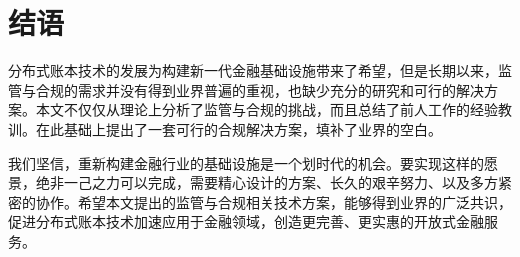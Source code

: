 \section{结语}

分布式账本技术的发展为构建新一代金融基础设施带来了希望，但是长期以来，监管与合规的需求并没有得到业界普遍的重视，也缺少充分的研究和可行的解决方案。本文不仅仅从理论上分析了监管与合规的挑战，而且总结了前人工作的经验教训。在此基础上提出了一套可行的合规解决方案，填补了业界的空白。

我们坚信，重新构建金融行业的基础设施是一个划时代的机会。要实现这样的愿景，绝非一己之力可以完成，需要精心设计的方案、长久的艰辛努力、以及多方紧密的协作。希望本文提出的监管与合规相关技术方案，能够得到业界的广泛共识，促进分布式账本技术加速应用于金融领域，创造更完善、更实惠的开放式金融服务。

